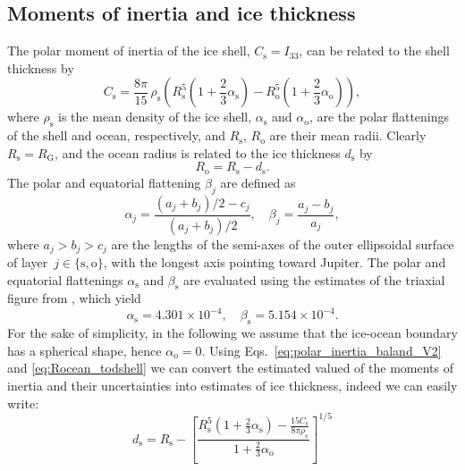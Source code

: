 \documentclass[lineno, pdflatex,sn-mathphys-ay]{sn-jnl}
\theoremstyle{thmstyleone}%
\theoremstyle{thmstyletwo}%
\theoremstyle{thmstylethree}%
\begin{document}
\subsection{Moments of inertia and ice thickness}\label{sec:moi_shell_thickness}

The polar moment of inertia of the ice shell, ${C_{\mathrm{s}} = I_{33}}$, can be related to the shell thickness by
\begin{equation} \label{eq:polar_inertia_baland_V2}
        C_{\mathrm{s}} =
        \frac{8\pi}{15}\, \rho_\mathrm{s}
        \left(
                R_\mathrm{s}^5 \left(1 + \frac{2}{3}\alpha_\mathrm{s} \right) - 
                R_{\mathrm{o}}^5 \left(1 + \frac{2}{3} \alpha_\mathrm{o} \right)
        \right),
\end{equation}
where $\rho_\mathrm{s}$ is the mean density of the ice shell, $\alpha_{\mathrm{s}}$ and $\alpha_{\mathrm{o}}$, are the polar flattenings of the shell and ocean, respectively, and $R_{\mathrm{s}}$, $R_{\mathrm{o}}$ are their mean radii.
Clearly ${R_{\mathrm{s}} = R_{\mathrm{G}}}$, and the ocean radius is related to the ice thickness $ d_{\mathrm{s}}$ by 
\begin{equation}\label{eq:Rocean_todshell}
	R_{\mathrm{o}} = R_{\mathrm{s}} - d_{\mathrm{s}}.
\end{equation}
The polar and equatorial flattening $\beta_j$ are defined as
\begin{equation}
         \alpha_j = \frac{ (a_j+b_j)/2 -c_j}{ (a_j+b_j)/2}, \quad \beta_j = \frac{a_j-b_j}{a_j},
\end{equation}
where ${a_j>b_j>c_j}$ are the lengths of the semi-axes of the outer ellipsoidal surface of layer~$j\in\{\mathrm{s,o}\}$, with the longest axis pointing toward Jupiter.
The polar and equatorial flattenings $\alpha_\mathrm{s}$ and $\beta_\mathrm{s}$ are evaluated using the estimates of the triaxial figure from \citet{1997AGGH...32..225B}, which yield
\begin{equation}
        \alpha_\mathrm{s} = 4.301 \times 10^{-4}, \quad \beta_\mathrm{s} = 5.154 \times 10^{-4}.
\end{equation}
%
For the sake of simplicity, in the following we assume that
the ice-ocean boundary has a spherical shape, hence ${\alpha_\mathrm{o} = 0}$.
%
%
Using Eqs.~\eqref{eq:polar_inertia_baland_V2} and \eqref{eq:Rocean_todshell} we can convert the estimated valued of the moments of inertia and their uncertainties into estimates of ice thickness, indeed we can easily write:
\begin{equation} \label{eq:ice_shell_thickness}
    d_{\mathrm{s}} = R_{\mathrm{s}} - \left[ \frac{ R_{\mathrm{s}}^5 \left(1 + \frac{2}{3}\alpha_{\mathrm{s}} \right) - \frac{15 C_{\mathrm{s}}}{8 \pi \rho_{\mathrm{s}}} }{ 1 + \frac{2}{3} \alpha_{\mathrm{o}} } \right]^{1/5}
\end{equation}
\end{document}
